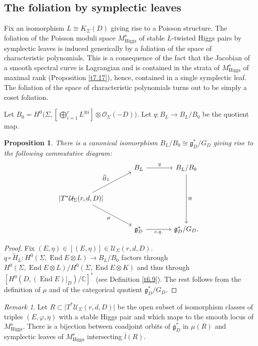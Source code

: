\documentclass[12pt,a4paper,oneside,english]{smfart}
\newtheorem{prop}[thm]{Proposition}
\theoremstyle{definition}
\theoremstyle{remark}
\newtheorem{rem}[thm]{Remark}
\DeclareMathOperator{\End}{End}
\newcommand{\Hig}{\mathrm{Higgs}}
\newcommand{\MHs}{M^{s}_{\Hig}}
\newcommand{\cU}{\mathcal{U}}
\newcommand{\cO}{\mathcal{O}}
\newcommand{\lbar}{\bar{l}}
\newcommand{\tot}[1]{\lvert #1 \rvert}
\newcommand{\HL}{\widetilde{H}_{L}}
\begin{document}
\subsection{The foliation by symplectic leaves}\label{sec:8.3}

Fix an isomorphism $L \cong K_\Sigma(D)$ giving rise to a Poisson structure. The foliation of the Poisson moduli space $\MHs$ of stable $L$-twisted Higgs pairs by symplectic leaves is induced generically by a foliation of the space of characteristic polynomials. This is a consequence of the fact that the Jacobian of a smooth spectral curve is Lagrangian and is contained in the strata of $\MHs$ of maximal rank (Proposition \ref{t7.17}), hence, contained in a single symplectic leaf. The foliation of the space of characteristic polynomials turns out to be simply a coset foliation.

Let $B_0 = H^0\bigl(\Sigma, [\bigoplus_{i=1}^{r} L^{\otimes i}] \otimes \cO_\Sigma(-D)\bigr)$. Let $q \colon B_L \to B_L/B_0$ be the quotient map.

\begin{prop}\label{t8.8}
There is a canonical isomorphism $B_L/B_0 \cong \mathfrak{g}_D^*/G_D$ giving rise to the following commutative diagram:
\[
\begin{tikzcd}[column sep=large, row sep=large]
& B_L \arrow[r, "q"] & B_L/B_0 \arrow[dd, "\cong"] \\
\tot{T^*\cU_\Sigma(r, d, D)} \arrow[ur, "\HL"] \arrow[dr, "\mu"'] & & \\
& \mathfrak{g}_D^* \arrow[r, "c.q."'] & \mathfrak{g}_D^*/G_D.
\end{tikzcd}
\]
\end{prop}

\begin{proof}
Fix $(E, \eta) \in [(E, \eta)] \in \cU_\Sigma(r, d, D)$. $q \circ \HL \colon H^0(\Sigma, \End E \otimes L) \to B_L/B_0$ factors through $H^0(\Sigma, \End E \otimes L)/H^0(\Sigma, \End E \otimes K)$ and thus through $[H^0(D, (\End E)|_D)/\mathbb{C}]^*$ (see Definition \ref{t6.9}). The rest follows from the definition of $\mu$ and of the categorical quotient $\mathfrak{g}_D^*/G_D$.
\end{proof}

\begin{rem}\label{t8.9}
Let $R \subset \tot{T^*\cU_\Sigma(r, d, D)}$ be the open subset of isomorphism classes of triples $(E, \varphi, \eta)$ with a stable Higgs pair and which maps to the smooth locus of $\MHs$. There is a bijection between coadjoint orbits of $\mathfrak{g}_D^*$ in $\mu(R)$ and symplectic leaves of $\MHs$ intersecting $\lbar(R)$.
\end{rem}
\end{document}
